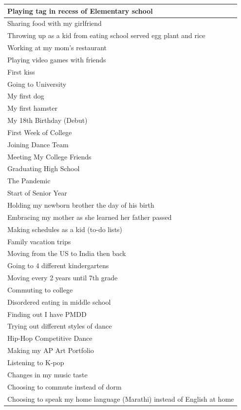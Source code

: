 \documentclass[
  .7em,
  letterpaper,
  DIV=11,
  numbers=noendperiod]{scrartcl}
\begin{document}
\begin{table}
\begin{tabular}{l}
\hline
Playing tag in recess of Elementary school\\
\hline
Sharing food with my girlfriend\\
\hline
Throwing up as a kid from eating school served egg plant and rice\\
\hline
Working at my mom's restaurant\\
\hline
Playing video games with friends\\
\hline
First kiss\\
\hline
Going to University\\
\hline
My first dog\\
\hline
My first hamster\\
\hline
My 18th Birthday (Debut)\\
\hline
First Week of College\\
\hline
Joining Dance Team\\
\hline
Meeting My College Friends\\
\hline
Graduating High School\\
\hline
The Pandemic\\
\hline
Start of Senior Year\\
\hline
Holding my newborn brother the day of his birth\\
\hline
Embracing my mother as she learned her father passed\\
\hline
Making schedules as a kid (to-do lists)\\
\hline
Family vacation trips\\
\hline
Moving from the US to India then back\\
\hline
Going to 4 different kindergartens\\
\hline
Moving every 2 years until 7th grade\\
\hline
Commuting to college\\
\hline
Disordered eating in middle school\\
\hline
Finding out I have PMDD\\
\hline
Trying out different styles of dance\\
\hline
Hip-Hop Competitive Dance\\
\hline
Making my AP Art Portfolio\\
\hline
Listening to K-pop\\
\hline
Changes in my music taste\\
\hline
Choosing to commute instead of dorm\\
\hline
Choosing to speak my home language (Marathi) instead of English at home\\

\end{tabular}
\end{table}
\end{document}
